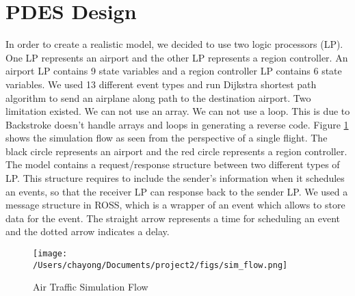 \section{PDES Design}

In order to create a realistic model, we decided to use two logic processors (LP). 
One LP represents an airport and the other LP represents a region controller.
An airport LP contains 9 state variables and a region controller LP contains 6 state variables.
We used 13 different event types and run Dijkstra shortest path algorithm to send an airplane along path to the destination airport.
Two limitation existed. We can not use an array. We can not use a loop. 
This is due to Backstroke doesn't handle arrays and loops in generating a reverse code.  
Figure \ref{fig:sim_flow} shows the simulation flow as seen from the perspective of a single flight.
The black circle represents an airport and the red circle represents a region controller. 
The model contains a request/response structure between two different types of LP.
This structure requires to include the sender's information when it schedules an events, so that 
the receiver LP can response back to the sender LP.
We used a message structure in ROSS, which is a wrapper of an event which allows to store data for the event. 
The straight arrow represents a time for scheduling an event and the dotted arrow indicates a delay. 


\begin{figure} [h]
\centering
\texttt{[image: /Users/chayong/Documents/project2/figs/sim\_flow.png]}
\caption{Air Traffic Simulation Flow}
\label{fig:sim_flow}
\end{figure}